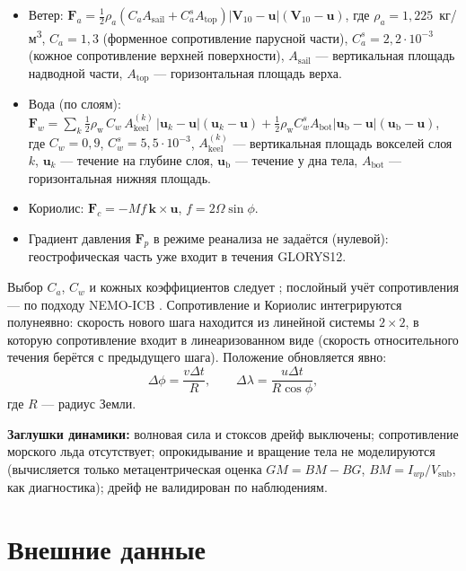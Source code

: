 \documentclass[12pt,a4paper]{article}
\newcommand{\rhow}{\rho_{\mathrm w}}
\begin{document}
\begin{itemize}
\item Ветер: $\mathbf F_a=\tfrac12\rho_a\left(C_a A_{\mathrm{sail}}+C^{s}_aA_{\mathrm{top}}\right)|\mathbf V_{10}-\mathbf u|(\mathbf V_{10}-\mathbf u)$, где $\rho_a=1{,}225$~кг/м\textsuperscript3, $C_a=1{,}3$ (форменное сопротивление парусной части), $C^s_a=2{,}2\cdot10^{-3}$ (кожное сопротивление верхней поверхности), $A_{\mathrm{sail}}$ --- вертикальная площадь надводной части, $A_{\mathrm{top}}$ --- горизонтальная площадь верха.
\item Вода (по слоям): $\mathbf F_w=\sum_k\tfrac12\rhow\,C_w\,A^{(k)}_{\mathrm{keel}}\,|\mathbf u_k-\mathbf u|(\mathbf u_k-\mathbf u)+\tfrac12\rhow C^s_wA_{\mathrm{bot}}|\mathbf u_{\mathrm b}-\mathbf u|(\mathbf u_{\mathrm b}-\mathbf u)$, где $C_w=0{,}9$, $C^s_w=5{,}5\cdot10^{-3}$, $A^{(k)}_{\mathrm{keel}}$ --- вертикальная площадь вокселей слоя $k$, $\mathbf u_k$ --- течение на глубине слоя, $\mathbf u_{\mathrm b}$ --- течение у дна тела, $A_{\mathrm{bot}}$ --- горизонтальная нижняя площадь.
\item Кориолис: $\mathbf F_c=-Mf\,\mathbf k\times\mathbf u$, $f=2\Omega\sin\phi$.
\item Градиент давления $\mathbf F_p$ в режиме реанализа не задаётся (нулевой): геострофическая часть уже входит в течения GLORYS12.
\end{itemize}
Выбор $C_a$, $C_w$ и кожных коэффициентов следует \cite{bigg1997,keghouche2009}; послойный учёт сопротивления --- по подходу NEMO-ICB \cite{marsh2015}. Сопротивление и Кориолис интегрируются полунеявно: скорость нового шага находится из линейной системы $2\times2$, в которую сопротивление входит в линеаризованном виде (скорость относительного течения берётся с предыдущего шага). Положение обновляется явно:
\begin{equation}
\Delta\phi=\frac{v\Delta t}{R},\qquad\Delta\lambda=\frac{u\Delta t}{R\cos\phi},
\end{equation}
где $R$ --- радиус Земли.

\textbf{Заглушки динамики:} волновая сила и стоксов дрейф выключены; сопротивление морского льда отсутствует; опрокидывание и вращение тела не моделируются (вычисляется только метацентрическая оценка $GM=BM-BG$, $BM=I_{wp}/V_{\mathrm{sub}}$, как диагностика); дрейф не валидирован по наблюдениям.

\section{Внешние данные}\label{sec:forcing}
\end{document}

